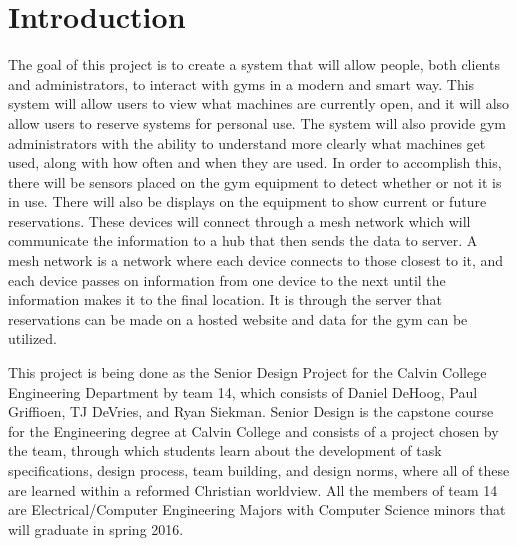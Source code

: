 \documentclass[PPFS.tex]{template/subfiles}
\begin{document}
\section{Introduction}

The goal of this project is to create a system that will allow people, both clients and administrators, to interact with gyms in a modern and smart way. This system will allow users to view what machines are currently open, and it will also allow users to reserve systems for personal use. The system will also provide gym administrators with the ability to understand more clearly what machines get used, along with how often and when they are used. In order to accomplish this, there will be sensors placed on the gym equipment to detect whether or not it is in use. There will also be displays on the equipment to show current or future reservations. These devices will connect through a mesh network which will communicate the information to a hub that then sends the data to server. A mesh network is a network where each device connects to those closest to it, and each device passes on information from one device to the next until the information makes it to the final location. It is through the server that reservations can be made on a hosted website and data for the gym can be utilized.

This project is being done as the Senior Design Project for the Calvin College Engineering Department by team 14, which consists of Daniel DeHoog, Paul Griffioen, TJ DeVries, and Ryan Siekman. Senior Design is the capstone course for the Engineering degree at Calvin College and consists of a project chosen by the team, through which students learn about the development of task specifications, design process, team building, and design norms, where all of these are learned within a reformed Christian worldview. All the members of team 14 are Electrical/Computer Engineering Majors with Computer Science minors that will graduate in spring 2016.
\end{document}
